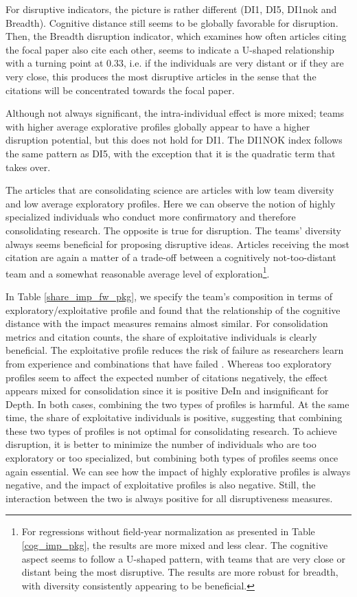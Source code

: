 For disruptive indicators, the picture is rather different (DI1, DI5, DI1nok and Breadth). Cognitive distance still seems to be globally favorable for disruption. Then, the Breadth disruption indicator, which examines how often articles citing the focal paper also cite each other, seems to indicate a U-shaped relationship with a turning point at 0.33, i.e. if the individuals are very distant or if they are very close, this produces the most disruptive articles in the sense that the citations will be concentrated towards the focal paper.

Although not always significant, the intra-individual effect is more mixed; teams with higher average explorative profiles globally appear to have a higher disruption potential, but this does not hold for DI1. The DI1NOK index follows the same pattern as DI5, with the exception that it is the quadratic term that takes over.

The articles that are consolidating science are articles with low team diversity and low average exploratory profiles. Here we can observe the notion of highly specialized individuals who conduct more confirmatory and therefore consolidating research. The opposite is true for disruption. The teams' diversity always seems beneficial for proposing disruptive ideas. Articles receiving the most citation are again a matter of a trade-off between a cognitively not-too-distant team and a somewhat reasonable average level of exploration\footnote{  \justifying For regressions without field-year normalization as presented in Table \ref{cog_imp_pkg}, the results are more mixed and less clear. The cognitive aspect seems to follow a U-shaped pattern, with teams that are very close or distant being the most disruptive. The results are more robust for breadth, with diversity consistently appearing to be beneficial.}.


In Table \ref{share_imp_fw_pkg}, we specify the team's composition in terms of exploratory/exploitative profile and found that the relationship of the cognitive distance with the impact measures remains almost similar. For consolidation metrics and citation counts, the share of exploitative individuals is clearly beneficial. The exploitative profile reduces the risk of failure as researchers learn from experience and combinations that have failed \citep{vincenti1990engineers}.
Whereas too exploratory profiles seem to affect the expected number of citations negatively, the effect appears mixed for consolidation since it is positive DeIn and insignificant for Depth. In both cases, combining the two types of profiles is harmful. At the same time, the share of exploitative individuals is positive, suggesting that combining these two types of profiles is not optimal for consolidating research.
To achieve disruption, it is better to minimize the number of individuals who are too exploratory or too specialized, but combining both types of profiles seems once again essential. We can see how the impact of highly explorative profiles is always negative, and the impact of exploitative profiles is also negative. Still, the interaction between the two is always positive for all disruptiveness measures.

